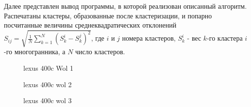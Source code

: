 \documentclass[a4paper,12pt, titlepage]{article}
\begin{document}
Далее представлен вывод программы, в которой реализован описанный алгоритм. 
Распечатаны кластеры, образованные после кластеризации,
и попарно посчитанные величины среднеквадратических отклонений 
$S_{ij} = \sqrt{\frac{1}{N} \sum\limits_{k = 1}^{N}(S_k^i - S_k^j)^2}$, где $i$ и $j$ номера кластеров, $S_k^i$ - вес $k$-го
кластера $i$-го многогранника, а $N$ число кластеров.   
\begin{figure}[h]
\noindent
\begin{multicols}{3}
\noindent{}		
	\caption{lexus 400c Wol 1}
	\label{allfinal1}
	\newpage
\noindent{}		
	\caption{lexus 400c wol 2}
	\label{allfinal2}

\noindent{}		
	\caption{lexus 400c wol 3}
	\label{allfinal3}
\end{multicols}
\end{figure}
\end{document}
